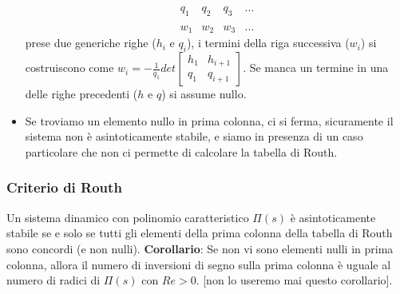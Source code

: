 \begin{itemize}
\[\begin{matrix}
            q_1 & q_2 & q_3 & \dots\\
            \;\\
            w_1 & w_2 & w_3 & \dots
        \end{matrix}
    \]
    prese due generiche righe ($h_i$ e $q_i$), i termini della riga successiva ($w_i$) si costruiscono come $w_i = - \frac{1}{q_1} det\left[\begin{matrix}
        h_1 & h_{i+1} \\
        q_1 & q_{i+1}
    \end{matrix}\right]$.\newline
    Se manca un termine in una delle righe precedenti ($h$ e $q$) si assume nullo.
    \item Se troviamo un elemento nullo in prima colonna, ci si ferma, sicuramente il sistema non è asintoticamente stabile, e siamo in presenza di un caso particolare che non ci permette di calcolare la tabella di Routh.
\end{itemize}
\subsubsection*{Criterio di Routh}
Un sistema dinamico con polinomio caratteristico $\Pi(s)$ è asintoticamente stabile se e solo se tutti gli elementi della prima colonna della tabella di Routh sono concordi (e non nulli).\newline
\newline
\textbf{Corollario}: Se non vi sono elementi nulli in prima colonna, allora il numero di inversioni di segno sulla prima colonna è uguale al numero di radici di $\Pi(s)$ con $Re>0$. [non lo useremo mai questo corollario].
